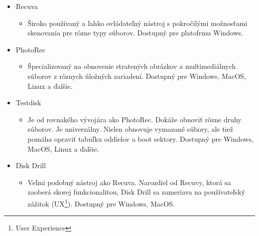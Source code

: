 \documentclass[12pt,oneside,slovak,a4paper]{article}
\begin{document}
\begin{spacing}{1.0}
\begin{itemize}
	\item Recuva
		\begin{itemize}
			\item Široko používaný a ľahko ovládateľný nástroj s pokročilými možnosťami skenovania pre rôzne typy súborov. Dostupný pre platofrmu Windows.
		\end{itemize}
	\item PhotoRec
		\begin{itemize}
			\item Špecializovaný na obnovenie stratených obrázkov a multimediálnych súborov z rôznych úložných zariadení. Dostupný pre Windows, MacOS, Linux a ďalšie.
		\end{itemize}
	\item Testdisk
		\begin{itemize}
			\item Je od rovnakého vývojára ako PhotoRec. Dokáže obnoviť rôzne druhy súborov. Je univerzálny. Nielen obnovuje vymazané súbory, ale tiež pomáha opraviť tabuľku oddielov a boot sektory. Dostupný pre Windows, MacOS, Linux a ďalšie.
		\end{itemize}
	\item Disk Drill
		\begin{itemize}
			\item Veľmi podobný nástroj ako Recuva. Narozdiel od Recuvy, ktorá sa zaoberá skorej funkcionalitou, Disk Drill sa zameriava na používateľský zážitok (UX\footnote{User Experience}). Dostupný pre Windows, MacOS.
		\end{itemize}
\end{itemize}
\end{spacing}
\end{document}
